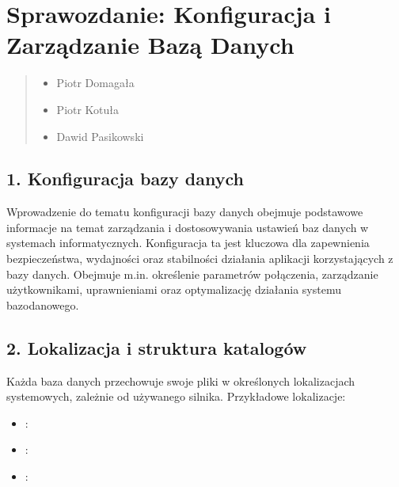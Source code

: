 \documentclass[a4paper,11pt,openany,english]{sphinxmanual}
\begin{document}
\sphinxstepscope


\section{Sprawozdanie: Konfiguracja i Zarządzanie Bazą Danych}
\label{\detokenize{rozdzial2/Konfiguracja_baz_danych/Konfiguracja_baz_danych:sprawozdanie-konfiguracja-i-zarzadzanie-baza-danych}}\label{\detokenize{rozdzial2/Konfiguracja_baz_danych/Konfiguracja_baz_danych::doc}}\begin{quote}\begin{description}
\begin{itemize}
\item {} 
\sphinxAtStartPar
Piotr Domagała

\item {} 
\sphinxAtStartPar
Piotr Kotuła

\item {} 
\sphinxAtStartPar
Dawid Pasikowski

\end{itemize}

\end{description}\end{quote}


\subsection{1. Konfiguracja bazy danych}
\label{\detokenize{rozdzial2/Konfiguracja_baz_danych/Konfiguracja_baz_danych:konfiguracja-bazy-danych}}
\sphinxAtStartPar
Wprowadzenie do tematu konfiguracji bazy danych obejmuje podstawowe informacje na temat zarządzania i dostosowywania ustawień baz danych w systemach informatycznych. Konfiguracja ta jest kluczowa dla zapewnienia bezpieczeństwa, wydajności oraz stabilności działania aplikacji korzystających z bazy danych. Obejmuje m.in. określenie parametrów połączenia, zarządzanie użytkownikami, uprawnieniami oraz optymalizację działania systemu bazodanowego.


\subsection{2. Lokalizacja i struktura katalogów}
\label{\detokenize{rozdzial2/Konfiguracja_baz_danych/Konfiguracja_baz_danych:lokalizacja-i-struktura-katalogow}}
\sphinxAtStartPar
Każda baza danych przechowuje swoje pliki w określonych lokalizacjach systemowych, zależnie od używanego silnika. Przykładowe lokalizacje:
\begin{itemize}
\item {} 
\sphinxAtStartPar
{}: 

\item {} 
\sphinxAtStartPar
{}: 

\item {} 
\sphinxAtStartPar
{}: 

\end{itemize}
\end{document}
